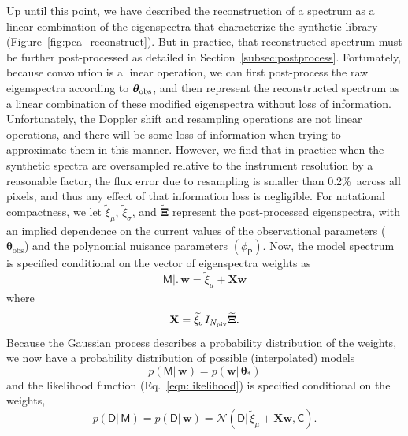 \documentclass[iop,floatfix,numberedappendix,twocolappendix]{emulateapj}
\newcommand{\vt}{ {\bm \theta}}
\begin{document}
Up until this point, we have described the reconstruction of a spectrum as a linear combination of 
the eigenspectra that characterize the synthetic library (Figure~\ref{fig:pca_reconstruct}).  But 
in practice, that reconstructed spectrum must be further post-processed as detailed in 
Section~\ref{subsec:postprocess}.  Fortunately, because convolution is a linear operation, we can 
first post-process the raw eigenspectra according to $\vt_{\rm obs}$, and then represent the 
reconstructed spectrum as a linear combination of these modified eigenspectra without loss of 
information.  Unfortunately, the Doppler shift and resampling operations are not linear operations, 
and there will be some loss of information when trying to approximate them in this manner.  
However, we find that in practice when the synthetic spectra are oversampled relative to the 
instrument resolution by a reasonable factor, the flux error due to resampling is smaller than 
0.2\%\ across all pixels, and thus any effect of that information loss is negligible.  For 
notational compactness, we let $\widetilde{\xi}_\mu$, $\widetilde{\xi}_\sigma$, and 
$\widetilde{\mathbf{\Xi}}$ represent the post-processed eigenspectra, with an implied dependence on 
the current values of the observational parameters ($\vt_\textrm{obs}$) and the polynomial nuisance 
parameters $(\phi_\mathsf{P})$.  Now, the model spectrum is specified conditional on the vector of 
eigenspectra weights as 
\begin{equation}
  \mathsf{M} \bigl | \bigr . \,\mathbf{w} = \widetilde{\xi}_\mu + \mathbf{X} \mathbf{w}
\end{equation}
where 
\begin{equation}
  \mathbf{X} = \widetilde{\xi}_\sigma I_{N_{\rm pix}} \widetilde{\mathbf{\Xi}}.
\end{equation}
Because the Gaussian process describes a probability distribution of the weights, we now have a probability distribution of possible (interpolated) models
\begin{equation}
  p(\mathsf{M} |\, \mathbf{w}) = p( \mathbf{w} |\, \vt_\ast)
\end{equation}
and the likelihood function (Eq.~\ref{eqn:likelihood}) is specified conditional on the weights,
\begin{equation}
  p( \mathsf{D} |\, \mathsf{M}) = p( \mathsf{D} |\, \mathbf{w}) = 
  \mathcal{N} \left ( \mathsf{D} |\, \widetilde{\xi}_\mu + \mathbf{X} \mathbf{w} , \mathsf{C} \right ).
  \label{eqn:likelihood_conditional}
\end{equation}
\end{document}
